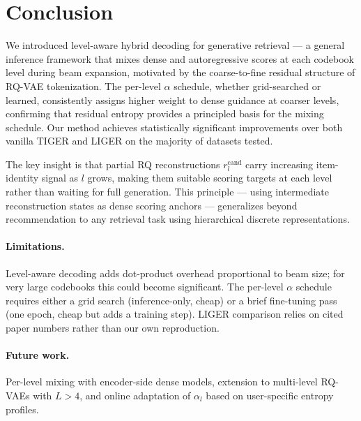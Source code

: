 \section{Conclusion}
\label{sec:conclusion}

We introduced level-aware hybrid decoding for generative retrieval — a general inference framework that mixes dense and autoregressive scores at each codebook level during beam expansion, motivated by the coarse-to-fine residual structure of RQ-VAE tokenization. The per-level $\alpha$ schedule, whether grid-searched or learned, consistently assigns higher weight to dense guidance at coarser levels, confirming that residual entropy provides a principled basis for the mixing schedule. Our method achieves statistically significant improvements over both vanilla TIGER and LIGER on the majority of datasets tested.

The key insight is that partial RQ reconstructions $r_l^{\text{cand}}$ carry increasing item-identity signal as $l$ grows, making them suitable scoring targets at each level rather than waiting for full generation. This principle — using intermediate reconstruction states as dense scoring anchors — generalizes beyond recommendation to any retrieval task using hierarchical discrete representations.

\paragraph{Limitations.} Level-aware decoding adds dot-product overhead proportional to beam size; for very large codebooks this could become significant. The per-level $\alpha$ schedule requires either a grid search (inference-only, cheap) or a brief fine-tuning pass (one epoch, cheap but adds a training step). LIGER comparison relies on cited paper numbers rather than our own reproduction.

\paragraph{Future work.} Per-level mixing with encoder-side dense models, extension to multi-level RQ-VAEs with $L > 4$, and online adaptation of $\alpha_l$ based on user-specific entropy profiles.
